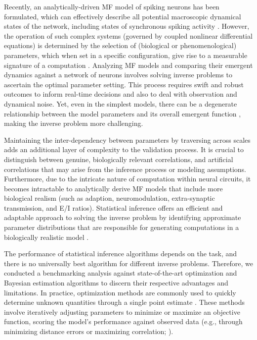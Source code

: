 \documentclass[preprint,11pt,authoryear]{elsarticle}
\begin{document}
Recently, an analytically-driven MF model of spiking neurons has been formulated, which can effectively describe all potential macroscopic dynamical states of the network, including states of synchronous spiking activity \citep{Montbrio_Pazo_Roxin}. However, the operation of such complex systems (governed by coupled nonlinear differential equations) is determined by the selection of (biological or phenomenological) parameters, which when set in a specific configuration, give rise to a measurable signature of a computation \citep{Achard2006, Sussillo2014}. Analyzing MF models and comparing their emergent dynamics against a network of neurons involves solving inverse problems to ascertain the optimal parameter setting. This process requires swift and robust outcomes to inform real-time decisions and also to deal with observation and dynamical noise. Yet, even in the simplest models, there can be a degenerate relationship between the model parameters and its overall emergent function \citep{Edelman2001, Prinz2004, Alonso2019}, making the inverse problem more challenging. 

Maintaining the inter-dependency between parameters by traversing across scales adds an additional layer of complexity to the validation process. It is crucial to distinguish between genuine, biologically relevant correlations, and artificial correlations that may arise from the inference process or modeling assumptions. Furthermore, due to the intricate nature of computation within neural circuits, it becomes intractable to analytically derive MF models that include more biological realism (such as adaption, neuromodulation, extra-synaptic transmission, and  E/I ratios). Statistical inference offers an efficient and adaptable approach to solving the inverse problem by identifying approximate parameter distributions that are responsible for generating computations in a biologically realistic model \citep{Achard2006, Liepe2014, Lueckmann2017, Goncalves2020, Bittner2021, Mlynarski2021}. 


The performance of statistical inference algorithms depends on the task, and there is no universally best algorithm for different inverse problems. Therefore, we conducted a benchmarking analysis against state-of-the-art optimization and Bayesian estimation algorithms to discern their respective advantages and limitations.
In practice, optimization methods are commonly used to quickly determine unknown quantities through a single point estimate \citep{Mendes1998, Nocedal1999, Kelley1999, Floudas2009}. These methods involve iteratively adjusting parameters to minimize or maximize an objective function, scoring the model's performance against observed data (e.g., through minimizing distance errors or maximizing correlation; \cite{Banga2008, Tashkova2011, Svensson2012, Hashemi2018}). 
\end{document}
